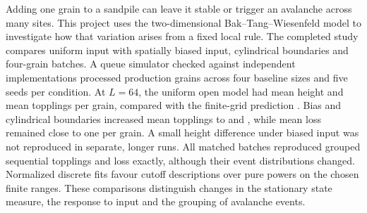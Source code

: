 Adding one grain to a sandpile can leave it stable or trigger an avalanche across many sites. This project uses the two-dimensional Bak--Tang--Wiesenfeld model to investigate how that variation arises from a fixed local rule. The completed study compares uniform input with spatially biased input, cylindrical boundaries and four-grain batches. A queue simulator checked against independent implementations processed  production grains across four baseline sizes and five seeds per condition. At $L=64$, the uniform open model had mean height  and mean topplings  per grain, compared with the finite-grid prediction . Bias and cylindrical boundaries increased mean topplings to  and , while mean loss remained close to one per grain. A small height difference under biased input was not reproduced in separate, longer runs. All  matched batches reproduced grouped sequential topplings and loss exactly, although their event distributions changed. Normalized discrete fits favour cutoff descriptions over pure powers on the chosen finite ranges. These comparisons distinguish changes in the stationary state measure, the response to input and the grouping of avalanche events.
